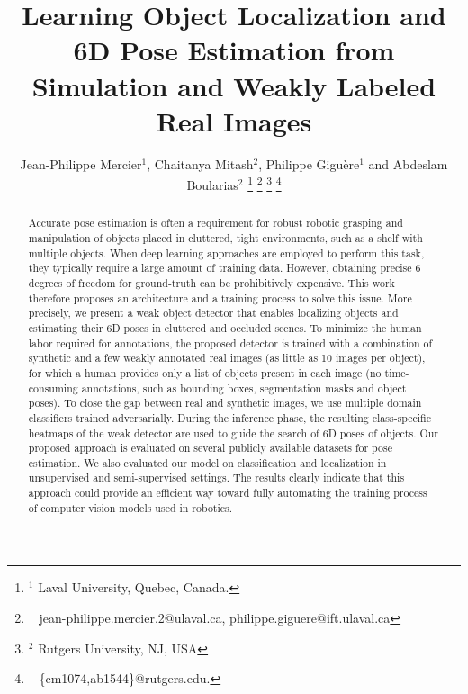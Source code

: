 \documentclass[letterpaper, 10 pt, conference]{ieeeconf}  %
\title{\LARGE \bf
Learning Object Localization and 6D Pose Estimation from Simulation and Weakly Labeled Real Images
}
\author{Jean-Philippe Mercier$^{1}$, Chaitanya Mitash$^{2}$, Philippe Gigu\`ere$^{1}$ and Abdeslam Boularias$^{2}$%
 \thanks{$^{1}$ Laval University, Quebec, Canada.}
 \thanks{$\enspace $ jean-philippe.mercier.2@ulaval.ca, philippe.giguere@ift.ulaval.ca}
 \thanks{$^{2}$ Rutgers University, NJ, USA}%
 \thanks{$\enspace$ \{cm1074,ab1544\}@rutgers.edu.}
 }
\begin{document}
  
\maketitle
\thispagestyle{empty}
\pagestyle{empty}




\begin{abstract}
Accurate pose estimation is often a requirement for robust robotic grasping and manipulation of objects placed in cluttered, tight environments, such as a shelf with multiple objects. When deep learning approaches are employed to perform this task, they typically require a large amount of training data. However, obtaining precise 6 degrees of freedom for ground-truth can be prohibitively expensive. This work therefore proposes an architecture and a training process to solve this issue. More precisely, we present a weak object detector that enables localizing objects and estimating their 6D poses in cluttered and occluded scenes. To minimize the human labor required for annotations, the proposed detector is trained with a combination of synthetic and a few weakly annotated real images (as little as 10 images per object), for which a human provides only a list of objects present in each image (no time-consuming annotations, such as bounding boxes, segmentation masks and object poses). To close the gap between real and synthetic images, we use multiple domain classifiers trained adversarially. During the inference phase, the resulting class-specific heatmaps of the weak detector are used to guide the search of 6D poses of objects. Our proposed approach is evaluated on several publicly available datasets for pose estimation. We also evaluated our model on classification and localization in unsupervised and semi-supervised settings. The results clearly indicate that this approach could provide an efficient way toward fully automating the training process of computer vision models used in robotics.




\end{abstract}
\end{document}
